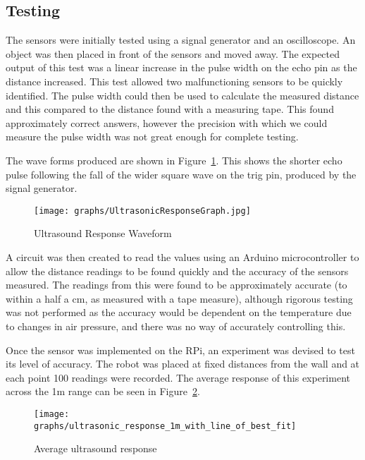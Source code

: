 \subsection{Testing}\label{elec/range/test}
The sensors were initially tested using a signal generator and an
oscilloscope. An object was then placed in front of the sensors
and moved away. The expected output of this test was a linear increase
in the pulse width on the echo pin as the distance
increased. This test allowed two malfunctioning sensors to be quickly identified. The pulse width could then be used to
calculate the measured distance and this compared to the distance
found with a measuring tape. This found approximately correct answers,
however the precision with which we could measure the pulse width was
not great enough for complete testing.

The wave forms produced are shown in Figure~\ref{UltrasoundWaveform}. This shows the shorter echo pulse following the fall of the wider
square wave on the trig pin, produced by the signal generator.

\begin{figure}[!ht]
	\centering
	\texttt{[image: graphs/UltrasonicResponseGraph.jpg]}
	\caption{Ultrasound Response Waveform}\label{UltrasoundWaveform}

\end{figure}

A circuit was then created to read the values using an Arduino
microcontroller to allow the distance readings to be found quickly
and the accuracy of the sensors measured. The readings from this were
found to be approximately accurate (to within a half a \si{\cm},
as measured with a tape measure), although rigorous testing was not
performed as the accuracy would be dependent on the temperature due
to changes in air pressure, and there was no way of accurately controlling this.

Once the sensor was implemented on the RPi, an experiment was devised to test its level of accuracy. The robot was placed at fixed distances from the wall and at each point 100 readings were recorded. The average response of this experiment across the 1m range can be seen in Figure~\ref{fig:usline}.

\begin{figure}[!ht]
	\centering
	\texttt{[image: graphs/ultrasonic\_response\_1m\_with\_line\_of\_best\_fit]}
	\caption{Average ultrasound response}\label{fig:usline}
\end{figure}


